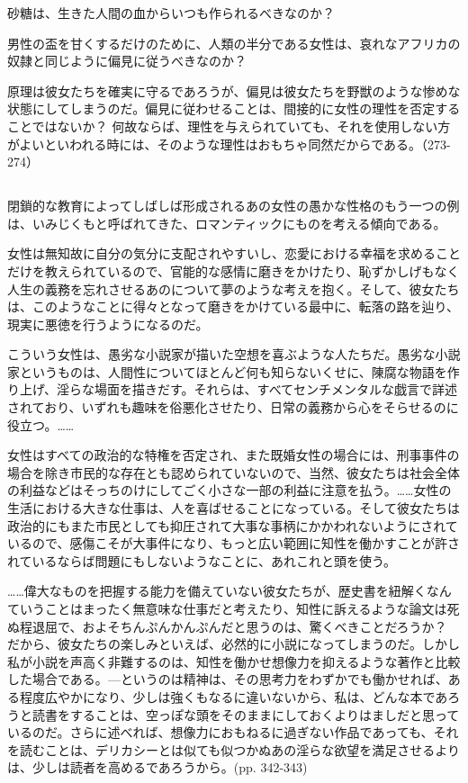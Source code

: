 砂糖は、生きた人間の血からいつも作られるべきなのか？

男性の盃を甘くするだけのために、人類の半分である女性は、哀れなアフリカの奴隷と同じように偏見に従うべきなのか？

原理は彼女たちを確実に守るであろうが、偏見は彼女たちを野獣のような惨めな状態にしてしまうのだ。偏見に従わせることは、間接的に女性の理性を否定することではないか？
何故ならば、理性を与えられていても、それを使用しない方がよいといわれる時には、そのような理性はおもちゃ同然だからである。（273-274）


\subsection{}

  閉鎖的な教育によってしばしば形成されるあの女性の愚かな性格のもう一つの例は、いみじくもと呼ばれてきた、ロマンティックにものを考える傾向である。

女性は無知故に自分の気分に支配されやすいし、恋愛における幸福を求めることだけを教えられているので、官能的な感情に磨きをかけたり、恥ずかしげもなく人生の義務を忘れさせるあのについて夢のような考えを抱く。そして、彼女たちは、このようなことに得々となって磨きをかけている最中に、転落の路を辿り、現実に悪徳を行うようになるのだ。

こういう女性は、愚劣な小説家が描いた空想を喜ぶような人たちだ。愚劣な小説家というものは、人間性についてほとんど何も知らないくせに、陳腐な物語を作り上げ、淫らな場面を描きだす。それらは、すべてセンチメンタルな戯言で詳述されており、いずれも趣味を俗悪化させたり、日常の義務から心をそらせるのに役立つ。……

女性はすべての政治的な特権を否定され、また既婚女性の場合には、刑事事件の場合を除き市民的な存在とも認められていないので、当然、彼女たちは社会全体の利益などはそっちのけにしてごく小さな一部の利益に注意を払う。……女性の生活における大きな仕事は、人を喜ばせることになっている。そして彼女たちは政治的にもまた市民としても抑圧されて大事な事柄にかかわれないようにされているので、感傷こそが大事件になり、もっと広い範囲に知性を働かすことが許されているならば問題にもしないようなことに、あれこれと頭を使う。

……偉大なものを把握する能力を備えていない彼女たちが、歴史書を紐解くなんていうことはまったく無意味な仕事だと考えたり、知性に訴えるような論文は死ぬ程退屈で、およそちんぷんかんぷんだと思うのは、驚くべきことだろうか？ だから、彼女たちの楽しみといえば、必然的に小説になってしまうのだ。しかし私が小説を声高く非難するのは、知性を働かせ想像力を抑えるような著作と比較した場合である。{\——}というのは精神は、その思考力をわずかでも働かせれば、ある程度広やかになり、少しは強くもなるに違いないから、私は、どんな本であろうと読書をすることは、空っぽな頭をそのままにしておくよりはましだと思っているのだ。さらに述べれば、想像力におもねるに過ぎない作品であっても、それを読むことは、デリカシーとは似ても似つかぬあの淫らな欲望を満足させるよりは、少しは読者を高めるであろうから。(pp. 342-343)



